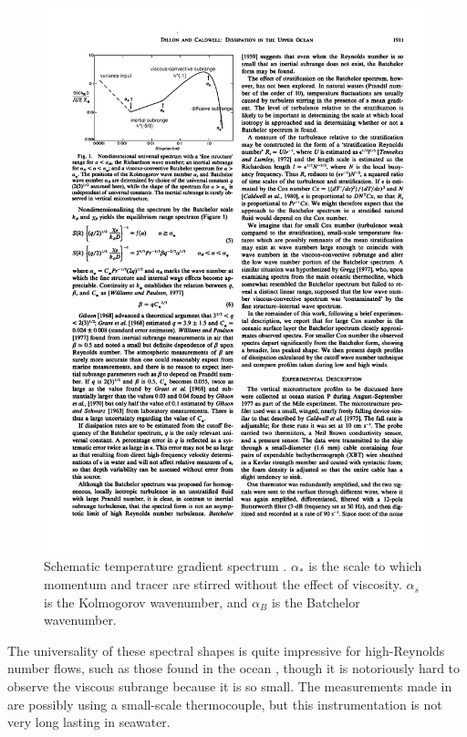 \documentclass[11pt]{article}
\begin{document}
\begin{figure}[hbtp]
  \begin{center}
    \includegraphics[width=5in]{images/DillonCaldwell80aFig1}
    \caption{Schematic temperature gradient spectrum \citep{dilloncaldwell80}.  $\alpha_*$ is the scale to which momentum and tracer are stirred without the effect of viscosity.  $\alpha_s$ is the Kolmogorov wavenumber, and $\alpha_B$ is the Batchelor wavenumber.}   
    \label{fig:DillonCaldwell80aFig1}
  \end{center}
\end{figure}

The universality of these spectral shapes is quite impressive for high-Reynolds number flows, such as those found in the ocean , though it is notoriously hard to observe the viscous subrange because it is so small.  The measurements made in  are possibly using a small-scale thermocouple, but this instrumentation is not very long lasting in seawater.  
\end{document}
